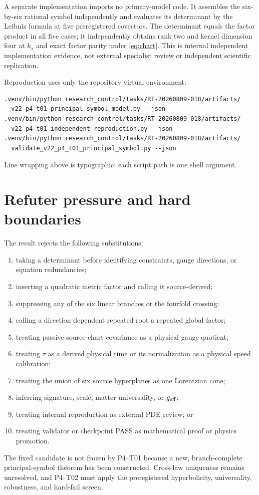 \documentclass[11pt]{article}
\begin{document}
A separate implementation imports no primary-model code.  It assembles the
six-by-six rational symbol independently and evaluates its determinant by the
Leibniz formula at five preregistered covectors.  The determinant equals the
factor product in all five cases; it independently obtains rank two and kernel
dimension four at $k_\star$ and exact factor parity under
\eqref{eq:chart}.  This is internal independent implementation evidence, not
external specialist review or independent scientific replication.

Reproduction uses only the repository virtual environment:
\begin{verbatim}
.venv/bin/python research_control/tasks/RT-20260809-018/artifacts/
  v22_p4_t01_principal_symbol_model.py --json
.venv/bin/python research_control/tasks/RT-20260809-018/artifacts/
  v22_p4_t01_independent_reproduction.py --json
.venv/bin/python research_control/tasks/RT-20260809-018/artifacts/
  validate_v22_p4_t01_principal_symbol.py --json
\end{verbatim}
Line wrapping above is typographic; each script path is one shell argument.

\section{Refuter pressure and hard boundaries}

The result rejects the following substitutions:
\begin{enumerate}[leftmargin=*]
 \item taking a determinant before identifying constraints, gauge directions,
 or equation redundancies;
 \item inserting a quadratic metric factor and calling it source-derived;
 \item suppressing any of the six linear branches or the fourfold crossing;
 \item calling a direction-dependent repeated root a repeated global factor;
 \item treating passive source-chart covariance as a physical gauge quotient;
 \item treating $\tau$ as a derived physical time or its normalization as a
 physical speed calibration;
 \item treating the union of six source hyperplanes as one Lorentzian cone;
 \item inferring signature, scale, matter universality, or $g_{\rm eff}$;
 \item treating internal reproduction as external PDE review; or
 \item treating validator or checkpoint PASS as mathematical proof or physics
 promotion.
\end{enumerate}
The fixed candidate is not frozen by P4--T01 because a new, branch-complete
principal-symbol theorem has been constructed.  Cross-law uniqueness remains
unresolved, and P4--T02 must apply the preregistered hyperbolicity,
universality, robustness, and hard-fail screen.
\end{document}
